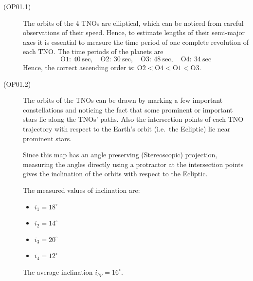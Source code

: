 \begin{description}
\item[(OP01.1)]
The orbits of the 4 TNOs are elliptical, which can be noticed from careful observations of
their speed. Hence, to estimate lengths of their semi-major axes it is essential to measure
the time period of one complete revolution of each TNO. The time periods of the planets are
\[
\mathrm{O1{:}\ 40\ sec},\quad \mathrm{O2{:}\ 30\ sec},\quad
\mathrm{O3{:}\ 48\ sec},\quad \mathrm{O4{:}\ 34\ sec}
\]
Hence, the correct ascending order is: $\mathrm{O2} < \mathrm{O4} < \mathrm{O1} < \mathrm{O3}$.

\item[(OP01.2)]
The orbits of the TNOs can be drawn by marking a few important constellations and noticing
the fact that some prominent or important stars lie along the TNOs' paths. Also the
intersection points of each TNO trajectory with respect to the Earth's orbit (i.e.\ the
Ecliptic) lie near prominent stars.

Since this map has an angle preserving (Stereoscopic) projection, measuring the angles
directly using a protractor at the intersection points gives the inclination of the orbits
with respect to the Ecliptic.

The measured values of inclination are:
\begin{itemize}
\item $i_1 = 18^\circ$
\item $i_2 = 14^\circ$
\item $i_3 = 20^\circ$
\item $i_4 = 12^\circ$
\end{itemize}
The average inclination $i_{hp} = 16^\circ$.
\end{description}

